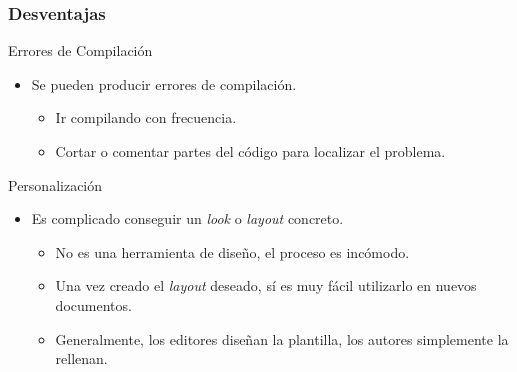 \documentclass[aspectratio=43]{beamer}%
\begin{document}
\begin{frame}[fragile]
\frametitle{\textbf{Desventajas}}
\justifying
 \begin{block}{Errores de Compilación}
\begin{itemize}\justifying
  \item Se pueden producir errores de compilación.
  \begin{itemize}\justifying
  \item Ir compilando con frecuencia.
  \item Cortar o comentar partes del código para localizar el problema.
\end{itemize}

\end{itemize}

\end{block}

\begin{block}{Personalización}
\begin{itemize}\justifying
  \item Es complicado conseguir un \textit{look} o \textit{layout} concreto.
  \begin{itemize}\justifying
  \item No es una herramienta de diseño, el proceso es incómodo.
  \item Una vez creado el \textit{layout} deseado, sí es muy fácil utilizarlo en nuevos documentos.
  \item Generalmente, los editores diseñan la plantilla, los autores simplemente la rellenan.
\end{itemize}

\end{itemize}

\end{block}

\end{frame}
\end{document}
